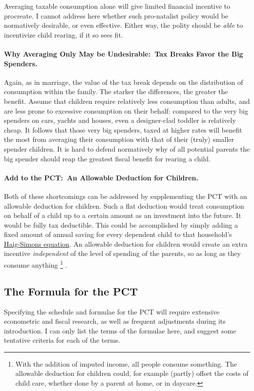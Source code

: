 Averaging taxable consumption alone will give limited financial incentive to procreate.
I cannot address here whether such pro-natalist policy would be normatively desirable, or even effective.
Either way, the polity should be \emph{able} to incentivize child rearing, if it so sees fit.

\paragraph{Why Averaging Only May be Undesirable:~Tax Breaks Favor the Big Spenders.} Again, as in marriage, the value of the tax break depends on the distribution of consumption within the family.
The starker the differences, the greater the benefit.
Assume that children require relatively less consumption than adults, and are less prone to excessive consumption on their behalf:
compared to the very big spenders on cars, yachts and houses, even a designer-clad toddler is relatively cheap.
It follows that those very big spenders, taxed at higher rates will benefit the most from averaging their consumption with that of their (truly) smaller spender children.
It is hard to defend normatively why of all potential parents the big spender should reap the greatest fiscal benefit for rearing a child.

\paragraph{Add to the PCT:~An Allowable Deduction for Children.} Both of these shortcomings can be addressed by supplementing the PCT with an allowable deduction for children.
Such a flat deduction would treat consumption on behalf of a child up to a certain amount as an investment into the future.
It would be fully tax deductible.
This could be accomplished by simply adding a fixed amount of annual saving for every dependent child to that household's \hyperref[eq:Haig-Simons]{Haig-Simons equation}.
An allowable deduction for children would create an extra incentive \emph{independent} of the level of spending of the parents, so as long as they consume anything
\footnote{
	With the addition of imputed income, all people consume something.
	The allowable deduction for children could, for example (partly) offset the costs of child care, whether done by a parent at home, or in daycare.
}
.

\subsection{The Formula for the PCT} Specifying the schedule and formulae for the PCT will require extensive econometric and fiscal research, as well as frequent adjustments during its introduction.
I can only list the terms of the formulae here, and suggest some tentative criteria for each of the terms.

